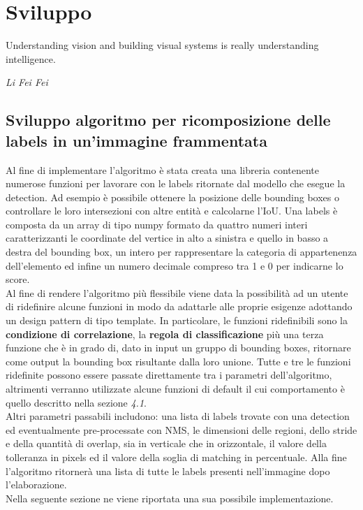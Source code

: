 \section{Sviluppo}
\epigraph{Understanding vision and building visual systems is really understanding intelligence.}{\textit{Li Fei Fei}}
\subsection{Sviluppo algoritmo per ricomposizione delle labels in un'immagine frammentata}
Al fine di implementare l'algoritmo è stata creata una libreria contenente numerose funzioni per lavorare con le labels ritornate dal modello che esegue la detection. Ad esempio è possibile ottenere la posizione delle bounding boxes o controllare le loro intersezioni con altre entità e calcolarne l'IoU. Una labels è composta da un array di tipo numpy formato da quattro numeri interi caratterizzanti le coordinate del vertice in alto a sinistra e quello in basso a destra del bounding box, un intero per rappresentare la categoria di appartenenza dell'elemento ed infine un numero decimale compreso tra 1 e 0 per indicarne lo score.\\
Al fine di rendere l'algoritmo più flessibile viene data la possibilità ad un utente di ridefinire alcune funzioni in modo da adattarle alle proprie esigenze adottando un design pattern di tipo template. In particolare, le funzioni ridefinibili sono la \textbf{condizione di correlazione}, la \textbf{regola di classificazione} più una terza funzione che è in grado di, dato in input un gruppo di bounding boxes, ritornare come output la bounding box risultante dalla loro unione. Tutte e tre le funzioni ridefinite possono essere passate direttamente tra i parametri dell'algoritmo, altrimenti verranno utilizzate alcune funzioni di default il cui comportamento è quello descritto nella sezione \textit{4.1}.\\
Altri parametri passabili includono: una lista di labels trovate con una detection ed eventualmente pre-processate con NMS, le dimensioni delle regioni, dello stride e della quantità di overlap, sia in verticale che in orizzontale, il valore della tolleranza in pixels ed il valore della soglia di matching in percentuale.
Alla fine l'algoritmo ritornerà una lista di tutte le labels presenti nell'immagine dopo l'elaborazione.\\ Nella seguente sezione ne viene riportata una sua possibile implementazione.
